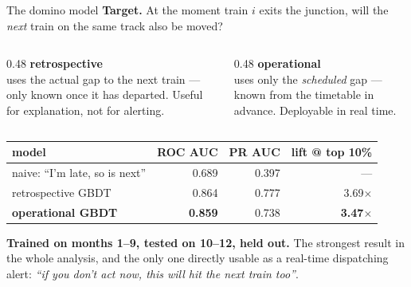 \documentclass[aspectratio=169,10pt]{beamer}
\newcommand{\srcnote}[1]{{\scriptsize\color{ink3}#1}}
\newcommand{\hl}[1]{{\color{corange}\textbf{#1}}}
\begin{document}
\begin{frame}{The domino model}
  \textbf{Target.} At the moment train $i$ exits the junction, will the \emph{next}
  train on the same track also be moved?

  \vspace{0.5em}
  \begin{columns}[T]
    \begin{column}{0.48\textwidth}
      \textbf{retrospective}\\[0.2em]
      \srcnote{uses the actual gap to the next train --- only known once it has
      departed. Useful for explanation, not for alerting.}
    \end{column}
    \begin{column}{0.48\textwidth}
      \textbf{operational}\\[0.2em]
      \srcnote{uses only the \emph{scheduled} gap --- known from the timetable in
      advance. Deployable in real time.}
    \end{column}
  \end{columns}

  \vspace{0.6em}
  \centering
  \begin{tabular}{@{}lrrr@{}}
    \toprule
    model & ROC AUC & PR AUC & lift @ top 10\% \\
    \midrule
    naive: ``I'm late, so is next'' & 0.689 & 0.397 & --- \\
    retrospective GBDT & 0.864 & 0.777 & 3.69$\times$ \\
    \textbf{operational GBDT} & \textbf{0.859} & 0.738 & \textbf{3.47$\times$} \\
    \bottomrule
  \end{tabular}

  \vspace{0.7em}
  \raggedright
  \hl{Trained on months 1--9, tested on 10--12, held out.} The strongest result in
  the whole analysis, and the only one directly usable as a real-time dispatching
  alert: \emph{``if you don't act now, this will hit the next train too''}.
\end{frame}
\end{document}
